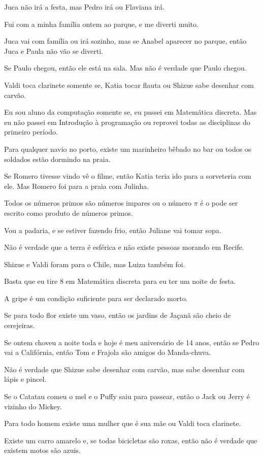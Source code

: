 \begin{exerList}
 \item Juca não irá a festa, mas Pedro irá ou Flaviana irá.
 \item Fui com a minha família ontem ao parque, e me diverti muito.
 \item Juca vai com família ou irá sozinho, mas se Anabel aparecer no parque, então Juca e Paula não vão se diverti.
 \item Se Paulo chegou, então ele está na sala. Mas não é verdade que Paulo chegou.
 \item Valdi toca clarinete somente se, Katia tocar flauta ou Shizue sabe desenhar com carvão.
 \item Eu sou aluno da computação somente se, eu passei em Matemática discreta. Mas eu não passei em Introdução à programação ou reprovei todas as disciplinas do primeiro período.
 \item Para qualquer navio no porto, existe um marinheiro bêbado no bar ou todos os soldados estão dormindo na praia.
 \item Se Romero tivesse vindo vê o filme, então Katia teria ido para a sorveteria com ele. Mas Romero foi para a praia com Julinha.
 \item Todos os números primos são números impares ou o número $\pi$ é o pode ser escrito como produto de números primos.
 \item Vou a padaria, e se estiver fazendo frio, então Juliane vai tomar sopa.
 \item Não é verdade que a terra é esférica e não existe pessoas morando em Recife.
 \item Shizue e Valdi foram para o Chile, mas Luiza também foi.
 \item Basta que eu tire 8 em Matemática discreta para eu ter um noite de festa.
 \item A gripe é um condição suficiente para ser declarado morto.
 \item Se para todo flor existe um vaso, então os jardins de Jaçanã são cheio de cerejeiras. 
 \item Se ontem choveu a noite toda e hoje é meu aniversário de 14 anos, então se Pedro vai a Califórnia, então Tom e Frajola são amigos do Manda-chuva.
 \item Não é verdade que Shizue sabe desenhar com carvão, mas sabe desenhar com lápis e pincel.
 \item Se o Catatau comeu o mel e o Puffy saiu para passear, então o Jack ou Jerry é vizinho do Mickey.
 \item Para todo homem existe uma mulher que é sua mãe ou Valdi toca clarinete.
 \item Existe um carro amarelo e, se todas bicicletas são roxas, então não é verdade que existem motos são azuis. 
\end{exerList}







